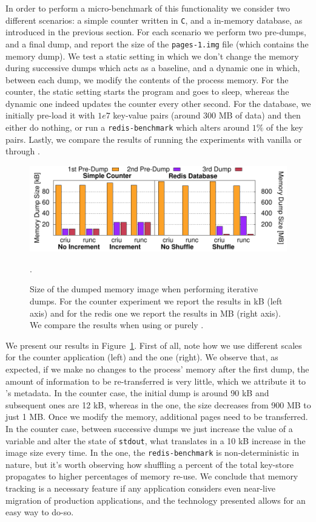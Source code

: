 In order to perform a micro-benchmark of this functionality we consider two different scenarios: a simple counter written in \texttt{C}, and a \redis in-memory database, as introduced in the previous section.
For each scenario we perform two pre-dumps, and a final dump, and report the size of the \texttt{pages-1.img} file (which contains the memory dump).
We test a static setting in which we don't change the memory during successive dumps which acts as a baseline, and a dynamic one in which, between each dump, we modify the contents of the process memory.
For the counter, the static setting starts the program and goes to sleep, whereas the dynamic one indeed updates the counter every other second.
For the database, we initially pre-load it with $1e7$ key-value pairs (around 300 MB of data) and then either do nothing, or run a \texttt{redis-benchmark} which alters around $1\%$ of the key pairs.
Lastly, we compare the results of running the experiments with vanilla \criu or through \runc.

\begin{figure}[h!]
    \centering
    \includegraphics[width=.8\textwidth]{figs/iterative-migration-microbenchmark/iterative_migration_microbenchmark.pdf}
    \caption[Size of the memory image for iterative dumps.]{Size of the dumped memory image when performing iterative dumps. For the counter experiment we report the results in kB (left axis) and for the redis one we report the results in MB (right axis). We compare the results when using \runc or purely \criu.\label{fig:iterative-migration-microbenchmark}}.
\end{figure}

We present our results in Figure~\ref{fig:iterative-migration-microbenchmark}.
First of all, note how we use different scales for the counter application (left) and the \redis one (right).
We observe that, as expected, if we make no changes to the process' memory after the first dump, the amount of information to be re-transferred is very little, which we attribute it to \criu's metadata.
In the counter case, the initial dump is around 90 kB and subsequent ones are 12 kB, whereas in the \redis one, the size decreases from 900 MB to just 1 MB.
Once we modify the memory, additional pages need to be transferred.
In the counter case, between successive dumps we just increase the value of a variable and alter the state of \texttt{stdout}, what translates in a 10 kB increase in the image size every time.
In the \redis one, the \texttt{redis-benchmark} is non-deterministic in nature, but it's worth observing how shuffling a percent of the total key-store propagates to higher percentages of memory re-use.
We conclude that memory tracking is a necessary feature if any application considers even near-live migration of production applications, and the technology presented allows for an easy way to do-so.

